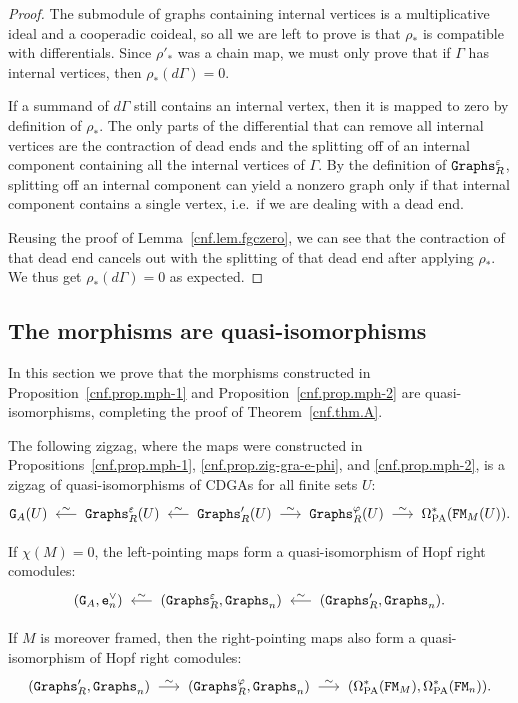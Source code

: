 \begin{proof}
  The submodule of graphs containing internal vertices is a multiplicative ideal and a cooperadic coideal, so all we are left to prove is that $\rho_{*}$ is compatible with differentials.
  Since $\rho'_{*}$ was a chain map, we must only prove that if $\Gamma$ has internal vertices, then $\rho_{*}(d \Gamma) = 0$.

  If a summand of $d\Gamma$ still contains an internal vertex, then it is mapped to zero by definition of $\rho_{*}$.
  The only parts of the differential that can remove all internal vertices are the contraction of dead ends and the splitting off of an internal component containing all the internal vertices of $\Gamma$.
  By the definition of $\mathtt{Graphs}^{\varepsilon}_{R}$, splitting off an internal component can yield a nonzero graph only if that internal component contains a single vertex, i.e.\ if we are dealing with a dead end.

  Reusing the proof of Lemma~\ref{cnf.lem.fgczero}, we can see that the contraction of that dead end cancels out with the splitting of that dead end after applying $\rho_{*}$.
  We thus get $\rho_{*}(d \Gamma) = 0$ as expected.
\end{proof}

\subsection{The morphisms are quasi-isomorphisms}
\label{cnf.sec.morphisms-are-quasi}

In this section we prove that the morphisms constructed in Proposition~\ref{cnf.prop.mph-1} and Proposition~\ref{cnf.prop.mph-2} are quasi-isomorphisms, completing the proof of Theorem~\ref{cnf.thm.A}.

\begin{theorem}
  \label{cnf.thm.Abis}
  The following zigzag, where the maps were constructed in Propositions~\ref{cnf.prop.mph-1}, \ref{cnf.prop.zig-gra-e-phi}, and \ref{cnf.prop.mph-2}, is a zigzag of quasi-isomorphisms of CDGAs for all finite sets $U$:
  \[ \GG{A}(U) \qiso* \Graphs^{\varepsilon}_{R}(U) \qiso* \Graphs'_{R}(U) \qiso \Graphs^{\varphi}_{R}(U) \qiso \OmPA^{*}(\FM_{M}(U)).\]

  If $\chi(M) = 0$, the left-pointing maps form a quasi-isomorphism of Hopf right comodules:
  \[ (\GG{A}, \enV) \qiso* (\Graphs^{\varepsilon}_{R}, \Graphs_{n}) \qiso* (\Graphs'_{R}, \Graphs_{n}). \]

  If $M$ is moreover framed, then the right-pointing maps also form a quasi-isomorphism of Hopf right comodules:
  \[ (\Graphs'_{R}, \Graphs_{n}) \qiso (\Graphs^{\varphi}_{R}, \Graphs_{n}) \qiso (\OmPA^{*}(\FM_{M}), \OmPA^{*}(\FM_{n})). \]
\end{theorem}

